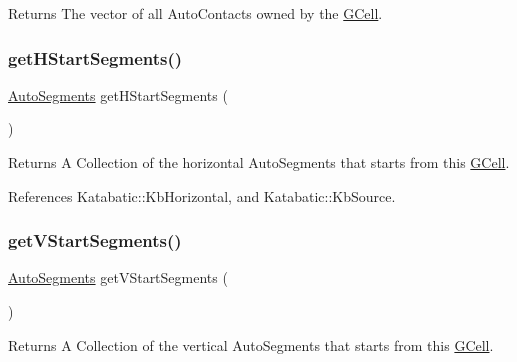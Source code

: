 \begin{DoxyReturn}{Returns}
The vector of all Auto\+Contacts owned by the \hyperlink{classKatabatic_1_1GCell}{G\+Cell}. 
\end{DoxyReturn}
\mbox{\label{classKatabatic_1_1GCell_a79668a41675e9ba0ca59d4b91e3b70be}} 
\subsubsection{\texorpdfstring{get\+H\+Start\+Segments()}{getHStartSegments()}}
{\footnotesize\ttfamily \hyperlink{namespaceKatabatic_a2221b0ddbc24f331809fc86f98e38041}{Auto\+Segments} get\+H\+Start\+Segments (\begin{DoxyParamCaption}{ }\end{DoxyParamCaption})}

\begin{DoxyReturn}{Returns}
A Collection of the horizontal Auto\+Segments that starts from this \hyperlink{classKatabatic_1_1GCell}{G\+Cell}. 
\end{DoxyReturn}


References Katabatic\+::\+Kb\+Horizontal, and Katabatic\+::\+Kb\+Source.

\mbox{\label{classKatabatic_1_1GCell_acbd17a4441905a4f5bc33a26bb338d0a}} 
\subsubsection{\texorpdfstring{get\+V\+Start\+Segments()}{getVStartSegments()}}
{\footnotesize\ttfamily \hyperlink{namespaceKatabatic_a2221b0ddbc24f331809fc86f98e38041}{Auto\+Segments} get\+V\+Start\+Segments (\begin{DoxyParamCaption}{ }\end{DoxyParamCaption})}

\begin{DoxyReturn}{Returns}
A Collection of the vertical Auto\+Segments that starts from this \hyperlink{classKatabatic_1_1GCell}{G\+Cell}. 
\end{DoxyReturn}


